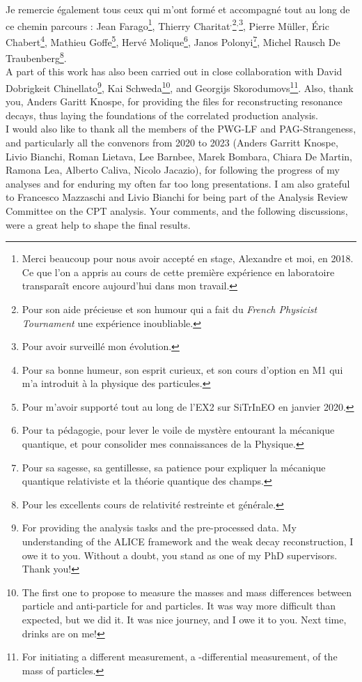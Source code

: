 Je remercie également tous ceux qui m'ont formé et accompagné tout au long de ce chemin parcours : Jean Farago\footnote{\label{stageL3}Merci beaucoup pour nous avoir accepté en stage, Alexandre et moi, en 2018. Ce que l'on a appris au cours de cette première expérience en laboratoire transparaît encore aujourd'hui dans mon travail.}, Thierry Charitat$^{,}$\footnote{\label{FPT}Pour son aide précieuse et son humour qui a fait du \textit{French Physicist Tournament} une expérience inoubliable.}$^{,}$\footnote{Pour avoir surveillé mon évolution.}, Pierre M\"uller, \'Eric Chabert\footnote{Pour sa bonne humeur, son esprit curieux, et son cours d'option en M1 qui m'a introduit à la physique des particules.}, Mathieu Goffe\footnote{Pour m'avoir supporté tout au long de l'EX2 sur SiTrInEO en janvier 2020.}, Hervé Molique\footnote{Pour ta pédagogie, pour lever le voile de mystère entourant la mécanique quantique, et pour consolider mes connaissances de la Physique.}, Janos Polonyi\footnote{Pour sa sagesse, sa gentillesse, sa patience pour expliquer la mécanique quantique relativiste et la théorie quantique des champs.}, Michel Rausch De Traubenberg\footnote{Pour les excellents cours de relativité restreinte et générale.}.\\

A part of this work has also been carried out in close collaboration with David Dobrigkeit Chinellato\footnote{For providing the analysis tasks and the pre-processed data. My understanding of the ALICE framework and the weak decay reconstruction, I owe it to you. Without a doubt, you stand as one of my PhD supervisors. Thank you!}, Kai Schweda\footnote{The first one to propose to measure the masses and mass differences between particle and anti-particle for \rmXi and \rmOmega particles. It was way more difficult than expected, but we did it. It was nice journey, and I owe it to you. Next time, drinks are on me!}, and Georgijs Skorodumovs\footnote{For initiating a different measurement, a \pT-differential measurement, of the mass of particles.}. Also, thank you, Anders Garitt Knospe, for providing the files for reconstructing \rmPhiMes resonance decays, thus laying the foundations of the correlated production analysis. \\

I would also like to thank all the members of the PWG-LF and PAG-Strangeness, and particularly all the convenors from 2020 to 2023 (Anders Garritt Knospe, Livio Bianchi, Roman Lietava, Lee Barnbee, Marek Bombara, Chiara De Martin, Ramona Lea, Alberto Caliva, Nicolo Jacazio), for following the progress of my analyses and for enduring my often far too long presentations. I am also grateful to Francesco Mazzaschi and Livio Bianchi for being part of the Analysis Review Committee on the CPT analysis. Your comments, and the following discussions, were a great help to shape the final results.\\

